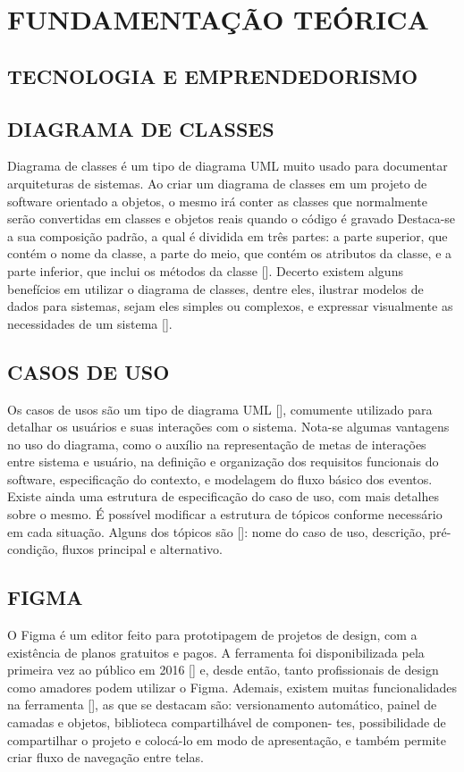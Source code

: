\documentclass[a4paper,12pt]{article}
\begin{document}
\section{FUNDAMENTAÇÃO TEÓRICA}
\subsection{TECNOLOGIA E EMPRENDEDORISMO}
\subsection{DIAGRAMA DE CLASSES}
Diagrama de classes é um tipo de diagrama UML muito usado para documentar arquiteturas de sistemas. Ao criar um diagrama de classes em um projeto de software orientado a
objetos, o mesmo irá conter as classes que normalmente serão convertidas em classes e objetos reais quando o código é gravado
Destaca-se a sua composição padrão, a qual é dividida em três partes: a parte superior,
que contém o nome da classe, a parte do meio, que contém os atributos da classe, e a parte
inferior, que inclui os métodos da classe [].
Decerto existem alguns benefícios em utilizar o diagrama de classes, dentre eles, ilustrar
modelos de dados para sistemas, sejam eles simples ou complexos, e expressar visualmente as
necessidades de um sistema [].
\subsection{CASOS DE USO}
Os casos de usos são um tipo de diagrama UML [], comumente utilizado para detalhar
os usuários e suas interações com o sistema. Nota-se algumas vantagens no uso do diagrama,
como o auxílio na representação de metas de interações entre sistema e usuário, na definição e
organização dos requisitos funcionais do software, especificação do contexto, e modelagem do
fluxo básico dos eventos.
Existe ainda uma estrutura de especificação do caso de uso, com mais detalhes sobre
o mesmo. É possível modificar a estrutura de tópicos conforme necessário em cada situação.
Alguns dos tópicos são []: nome do caso de uso, descrição, pré-condição, fluxos principal e
alternativo.
\subsection{FIGMA}
O Figma é um editor feito para prototipagem de projetos de design, com a existência de
planos gratuitos e pagos. A ferramenta foi disponibilizada pela primeira vez ao público em 2016
    [] e, desde então, tanto profissionais de design como amadores podem utilizar o Figma.
Ademais, existem muitas funcionalidades na ferramenta [], as que se destacam são:
versionamento automático, painel de camadas e objetos, biblioteca compartilhável de componen-
tes, possibilidade de compartilhar o projeto e colocá-lo em modo de apresentação, e também
permite criar fluxo de navegação entre telas.
\end{document}
